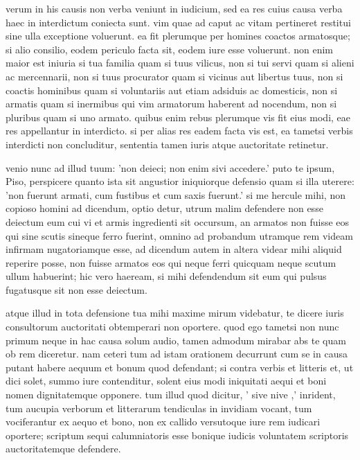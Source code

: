  verum in his causis non verba veniunt in iudicium, sed ea res cuius causa verba haec in interdictum coniecta sunt. vim quae ad caput ac vitam pertineret restitui sine ulla exceptione voluerunt. ea fit plerumque per homines coactos armatosque; si alio consilio, eodem periculo facta sit, eodem iure esse voluerunt. non enim maior est iniuria si tua familia quam si tuus vilicus, non si tui servi quam si alieni ac mercennarii, non si tuus procurator quam si vicinus aut libertus tuus, non si coactis hominibus quam si voluntariis aut etiam adsiduis ac domesticis, non si armatis quam si inermibus qui vim armatorum haberent ad nocendum, non si pluribus quam si uno armato. quibus enim rebus plerumque vis fit eius modi, eae res appellantur in interdicto. si per alias res eadem facta vis est, ea tametsi verbis interdicti non concluditur, sententia tamen iuris atque auctoritate retinetur.

 venio nunc ad illud tuum: 'non deieci; non enim sivi accedere.' puto te ipsum, Piso, perspicere quanto ista sit angustior iniquiorque defensio quam si illa uterere: 'non fuerunt armati, cum fustibus et cum saxis fuerunt.' si me hercule mihi, non copioso homini ad dicendum, optio detur, utrum malim defendere non esse deiectum eum cui vi et armis ingredienti sit occursum, an armatos non fuisse eos qui sine scutis sineque ferro fuerint, omnino ad probandum utramque rem videam infirmam nugatoriamque esse, ad dicendum autem in altera videar mihi aliquid reperire posse, non fuisse armatos eos qui neque ferri quicquam neque scutum ullum habuerint; hic vero haeream, si mihi defendendum sit eum qui pulsus fugatusque sit non esse deiectum.

 atque illud in tota defensione tua mihi maxime mirum videbatur, te dicere iuris consultorum auctoritati obtemperari non oportere. quod ego tametsi non nunc primum neque in hac causa solum audio, tamen admodum mirabar abs te quam ob rem diceretur. nam ceteri tum ad istam orationem decurrunt cum se in causa putant habere aequum et bonum quod defendant; si contra verbis et litteris et, ut dici solet, summo iure contenditur, solent eius modi iniquitati aequi et boni nomen dignitatemque opponere. tum illud quod dicitur, ' sive nive ,' inrident, tum aucupia verborum et litterarum tendiculas in invidiam vocant, tum vociferantur ex aequo et bono, non ex callido versutoque iure rem iudicari oportere; scriptum sequi calumniatoris esse bonique iudicis voluntatem scriptoris auctoritatemque defendere.

